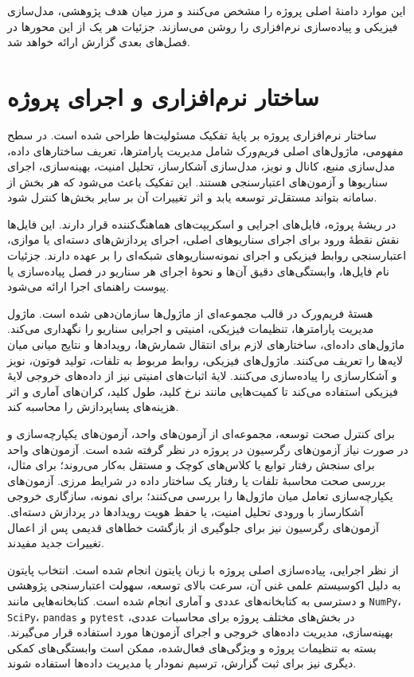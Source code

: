 این موارد دامنهٔ اصلی پروژه را مشخص می‌کنند و مرز میان هدف پژوهشی، مدل‌سازی فیزیکی و پیاده‌سازی نرم‌افزاری را روشن می‌سازند. جزئیات هر یک از این محورها در فصل‌های بعدی گزارش ارائه خواهد شد.

\section{ساختار نرم‌افزاری و اجرای پروژه}

ساختار نرم‌افزاری پروژه بر پایهٔ تفکیک مسئولیت‌ها طراحی شده است. در سطح مفهومی، ماژول‌های اصلی فریم‌ورک شامل مدیریت پارامترها، تعریف ساختارهای داده، مدل‌سازی منبع، کانال و نویز، مدل‌سازی آشکارساز، تحلیل امنیت، بهینه‌سازی، اجرای سناریوها و آزمون‌های اعتبارسنجی هستند. این تفکیک باعث می‌شود که هر بخش از سامانه بتواند مستقل‌تر توسعه یابد و اثر تغییرات آن بر سایر بخش‌ها کنترل شود.

در ریشهٔ پروژه، فایل‌های اجرایی و اسکریپت‌های هماهنگ‌کننده قرار دارند. این فایل‌ها نقش نقطهٔ ورود برای اجرای سناریوهای اصلی، اجرای پردازش‌های دسته‌ای یا موازی، اعتبارسنجی روابط فیزیکی و اجرای نمونه‌سناریوهای شبکه‌ای را بر عهده دارند. جزئیات نام فایل‌ها، وابستگی‌های دقیق آن‌ها و نحوهٔ اجرای هر سناریو در فصل پیاده‌سازی یا پیوست راهنمای اجرا ارائه می‌شود.

هستهٔ فریم‌ورک در قالب مجموعه‌ای از ماژول‌ها سازمان‌دهی شده است. ماژول مدیریت پارامترها، تنظیمات فیزیکی، امنیتی و اجرایی سناریو را نگهداری می‌کند. ماژول‌های داده‌ای، ساختارهای لازم برای انتقال شمارش‌ها، رویدادها و نتایج میانی میان لایه‌ها را تعریف می‌کنند. ماژول‌های فیزیکی، روابط مربوط به تلفات، تولید فوتون، نویز و آشکارسازی را پیاده‌سازی می‌کنند. لایهٔ اثبات‌های امنیتی نیز از داده‌های خروجی لایهٔ فیزیکی استفاده می‌کند تا کمیت‌هایی مانند نرخ کلید، طول کلید، کران‌های آماری و اثر هزینه‌های پساپردازش را محاسبه کند.

برای کنترل صحت توسعه، مجموعه‌ای از آزمون‌های واحد، آزمون‌های یکپارچه‌سازی و در صورت نیاز آزمون‌های رگرسیون در پروژه در نظر گرفته شده است. آزمون‌های واحد برای سنجش رفتار توابع یا کلاس‌های کوچک و مستقل به‌کار می‌روند؛ برای مثال، بررسی صحت محاسبهٔ تلفات یا رفتار یک ساختار داده در شرایط مرزی. آزمون‌های یکپارچه‌سازی تعامل میان ماژول‌ها را بررسی می‌کنند؛ برای نمونه، سازگاری خروجی آشکارساز با ورودی تحلیل امنیت، یا حفظ هویت رویدادها در پردازش دسته‌ای. آزمون‌های رگرسیون نیز برای جلوگیری از بازگشت خطاهای قدیمی پس از اعمال تغییرات جدید مفیدند.

از نظر اجرایی، پیاده‌سازی اصلی پروژه با زبان پایتون انجام شده است. انتخاب پایتون به دلیل اکوسیستم علمی غنی آن، سرعت بالای توسعه، سهولت اعتبارسنجی پژوهشی و دسترسی به کتابخانه‌های عددی و آماری انجام شده است. کتابخانه‌هایی مانند \texttt{NumPy}، \texttt{SciPy}، \texttt{pandas} و \texttt{pytest} در بخش‌های مختلف پروژه برای محاسبات عددی، بهینه‌سازی، مدیریت داده‌های خروجی و اجرای آزمون‌ها مورد استفاده قرار می‌گیرند. بسته به تنظیمات پروژه و ویژگی‌های فعال‌شده، ممکن است وابستگی‌های کمکی دیگری نیز برای ثبت گزارش، ترسیم نمودار یا مدیریت داده‌ها استفاده شوند.

